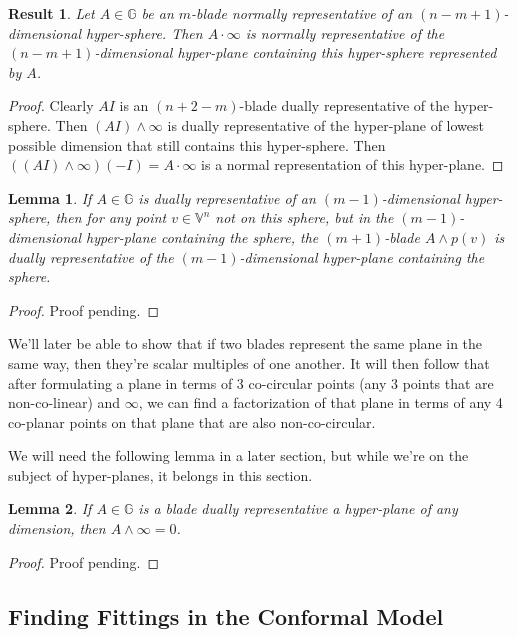 \documentclass{article}
\newcommand{\V}{\mathbb{V}}
\newcommand{\G}{\mathbb{G}}
\newcommand{\nvai}{\infty}
\newtheorem{lemma}{Lemma}[section]
\newtheorem{result}{Result}[section]
\begin{document}
\begin{result}
Let $A\in\G$ be an $m$-blade normally representative of an $(n-m+1)$-dimensional
hyper-sphere.  Then $A\cdot\nvai$ is normally representative of the $(n-m+1)$-dimensional
hyper-plane containing this hyper-sphere represented by $A$.
\end{result}
\begin{proof}
Clearly $AI$ is an $(n+2-m)$-blade dually representative of the hyper-sphere.
Then $(AI)\wedge\nvai$ is dually representative of the hyper-plane of lowest
possible dimension that still contains this hyper-sphere.  Then
$((AI)\wedge\nvai)(-I)=A\cdot\nvai$ is a normal representation of this hyper-plane.
\end{proof}

\begin{lemma}
If $A\in\G$ is dually representative of an $(m-1)$-dimensional hyper-sphere, then for any
point $v\in\V^n$ not on this sphere, but in the $(m-1)$-dimensional hyper-plane containing
the sphere, the $(m+1)$-blade $A\wedge p(v)$ is dually representative of the $(m-1)$-dimensional
hyper-plane containing the sphere.
\end{lemma}
\begin{proof}
Proof pending.
\end{proof}

We'll later be able to show that if two blades represent the same plane in the same
way, then they're scalar multiples of one another.  It will then follow that after
formulating a plane in terms of 3 co-circular points (any 3 points that are non-co-linear)
and $\nvai$, we can find a factorization
of that plane in terms of any 4 co-planar points on that plane that are also non-co-circular.

We will need the following lemma in a later section, but while we're on the
subject of hyper-planes, it belongs in this section.
\begin{lemma}\label{lma_planes_contain_nvai}
If $A\in\G$ is a blade dually representative a hyper-plane of any dimension,
then $A\wedge\nvai=0$.
\end{lemma}
\begin{proof}
Proof pending.
\end{proof}

\subsection{Finding Fittings in the Conformal Model}
\end{document}
